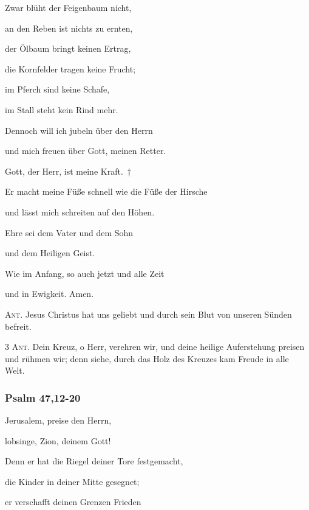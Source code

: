 \noindent Zwar blüht der Feigenbaum nicht,~\GreStar{}~\nopagebreak

an den Reben ist nichts zu ernten, 

\noindent der Ölbaum bringt keinen Ertrag,~\GreStar{}~\nopagebreak

die Kornfelder tragen keine Frucht; 

\noindent im Pferch sind keine Schafe,~\GreStar{}~\nopagebreak

im Stall steht kein Rind mehr.

\noindent Dennoch will ich jubeln über den Herrn~\GreStar{}~\nopagebreak

und mich freuen über Gott, meinen Retter.

\noindent Gott, der Herr, ist meine Kraft.~†~\nopagebreak

Er macht meine Füße schnell wie die Füße der Hirsche~\GreStar{}~\nopagebreak

und lässt mich schreiten auf den Höhen.

\noindent Ehre sei dem Vater und dem Sohn~\GreStar{}~\nopagebreak

und dem Heiligen Geist.

\noindent Wie im Anfang, so auch jetzt und alle Zeit~\GreStar{}~\nopagebreak

und in Ewigkeit. Amen.

\vspace{10pt}

\noindent \textsc{Ant.} Jesus Christus hat uns geliebt und durch sein Blut von unseren Sünden befreit.

\vspace{10pt}

\noindent \textsc{3 Ant.} Dein Kreuz, o Herr, verehren wir, und deine heilige Auferstehung preisen und rühmen wir; denn siehe, durch das Holz des Kreuzes kam Freude in alle Welt.

\subsubsection{Psalm 47,12-20}

\noindent Jerusalem, preise den Herrn,~\GreStar{}~\nopagebreak

lobsinge, Zion, deinem Gott!

\noindent Denn er hat die Riegel deiner Tore festgemacht,~\GreStar{}~\nopagebreak

die Kinder in deiner Mitte gesegnet;

\noindent er verschafft deinen Grenzen Frieden~\GreStar{}~\nopagebreak


